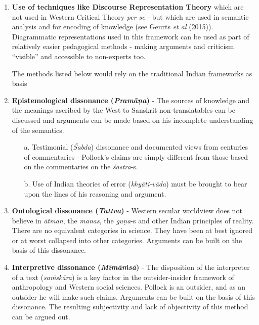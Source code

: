 \begin{enumerate}
\item {\bf Use of techniques like Discourse Representation Theory} which are not used in Western Critical Theory {\sl per se} - but which are used in semantic analysis and for encoding of knowledge (see Geurts {\sl et al} (2015)). Diagrammatic representations used in this framework can be used as part of relatively easier pedagogical methods - making arguments and criticism ``visible'' and accessible to non-experts too.

The methods listed below would rely on the traditional Indian frameworks as basis

\item {\bf Epistemological dissonance ({{\sl\bfseries Pramāṇa}\relax})} - The sources of knowledge and the meanings ascribed by the West to Sanskrit non-translatables can be discussed and arguments can be made based on his incomplete understanding of the semantics.
\begin{itemize}
\item[a.]  Testimonial ({\sl Śabda}) dissonance and documented views from centuries of commentaries - Pollock's claims are simply different from those based on the commentaries on the {\sl śāstra}-s.

\item[b.] Use of Indian theories of error ({\sl khyāti-vāda}) must be brought to bear upon the lines of his reasoning and argument.
\end{itemize}

\item {\bf Ontological dissonance ({{\sl\bfseries Tattva}\relax})} -  Western secular worldview does not believe in {\sl ātman}, the {\sl manas}, the {\sl guṇa}-s and other Indian principles of reality. There are no equivalent categories in science. They have been at best ignored or at worst collapsed into other categories. Arguments can be built on the basis of this dissonance.

\item {\bf Interpretive dissonance ({{\sl\bfseries Mīmāṁsā}\relax})} - The disposition of the interpreter of a text ({\sl saṁskāra}) is a key factor in the outsider-insider framework of anthropology and Western social sciences. Pollock is an outsider, and as an outsider he will make such claims. Arguments can be built on the basis of this dissonance. The resulting subjectivity and lack of objectivity of this method can be argued out.


\end{enumerate}
